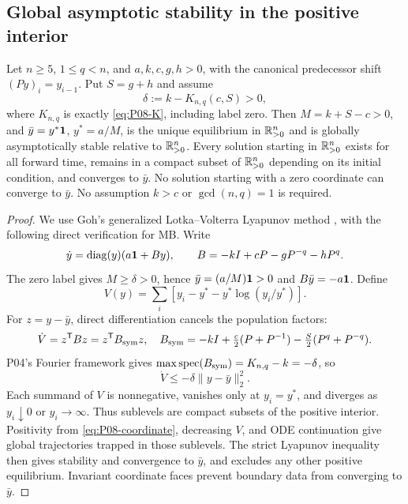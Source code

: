\subsection{Global asymptotic stability in the positive interior}
\begin{theorem}
\label{thm:P08-global-interior}
Let $n\ge5$, $1\le q<n$, and $a,k,c,g,h>0$, with the canonical
predecessor shift $(Py)_i=y_{i-1}$. Put $S=g+h$ and assume
\[
 \delta:=k-K_{n,q}(c,S)>0,
\]
where $K_{n,q}$ is exactly \eqref{eq:P08-K}, including label zero.
Then $M=k+S-c>0$, and $\bar y=y^*\mathbf{1}$, $y^*=a/M$, is the unique
equilibrium in $\mathbb{R}_{>0}^{n}$ and is globally asymptotically stable relative
to $\mathbb{R}_{>0}^{n}$. Every solution starting in $\mathbb{R}_{>0}^{n}$ exists for all
forward time, remains in a compact subset of $\mathbb{R}_{>0}^{n}$ depending on
its initial condition, and converges to $\bar y$.
No solution starting with a zero coordinate can converge to $\bar y$.
No assumption $k>c$ or $\gcd(n,q)=1$ is required.
\end{theorem}
\begin{proof}
We use Goh's generalized Lotka--Volterra Lyapunov method
\cite{Goh1977}, with the following direct verification for MB. Write
\begin{equation}
 \dot y=\operatorname{diag}(y)(a\mathbf{1}+By),\qquad B=-kI+cP-gP^{-q}-hP^q.
 \label{eq:P08-global-field}
\end{equation}
The zero label gives $M\ge\delta>0$, hence
$\bar y=(a/M)\mathbf{1}>0$ and $B\bar y=-a\mathbf{1}$. Define
\begin{equation}
 V(y)=\sum_i[y_i-y^*-y^*\log(y_i/y^*)].
 \label{eq:P08-global-V}
\end{equation}
For $z=y-\bar y$, direct differentiation cancels the population factors:
\begin{equation}
 \dot V=z^{\mathsf T}Bz=z^{\mathsf T}B_{\rm sym}z,
 \quad B_{\rm sym}=-kI+\tfrac c2(P+P^{-1})-\tfrac S2(P^q+P^{-q}).
 \label{eq:P08-global-cancellation}
\end{equation}
P04's Fourier framework gives
$\max\operatorname{spec}(B_{\rm sym})=K_{n,q}-k=-\delta$, so
\begin{equation}
 \dot V\le-\delta\|y-\bar y\|_2^2.
 \label{eq:P08-global-decay}
\end{equation}
Each summand of $V$ is nonnegative, vanishes only at $y_i=y^*$,
and diverges as $y_i\downarrow0$ or $y_i\to\infty$.
Thus sublevels are compact subsets of the positive interior. Positivity
from \eqref{eq:P08-coordinate}, decreasing $V$, and ODE continuation
give global trajectories trapped in those sublevels. The strict Lyapunov
inequality then gives stability and convergence to $\bar y$, and excludes
any other positive equilibrium. Invariant coordinate faces prevent
boundary data from converging to $\bar y$.
\end{proof}


